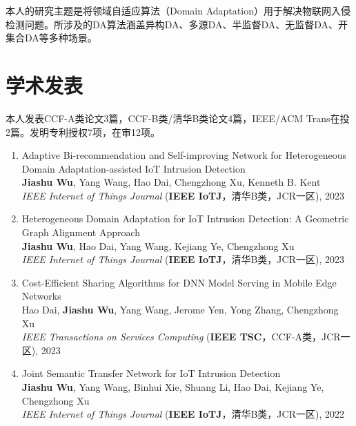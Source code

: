 \documentclass[letterpaper,11pt]{article}
\newcommand{\RNum}[1]{\uppercase\expandafter{\romannumeral #1\relax}}
\begin{document}
本人的研究主题是将领域自适应算法（Domain Adaptation）用于解决物联网入侵检测问题。所涉及的DA算法涵盖异构DA、多源DA、半监督DA、无监督DA、开集合DA等多种场景。

\vspace{1pt}

\section{学术发表}

本人发表CCF-A类论文3篇，CCF-B类/清华B类论文4篇，IEEE/ACM Trans在投2篇。发明专利授权7项，在审12项。

\begin{enumerate}
  \item Adaptive Bi-recommendation and Self-improving Network for Heterogeneous Domain Adaptation-assisted IoT Intrusion Detection\\
  \textbf{Jiashu Wu}, Yang Wang\textsuperscript{\Letter}, Hao Dai, Chengzhong Xu, Kenneth B. Kent\\
  \textit{IEEE Internet of Things Journal} (\textbf{IEEE IoTJ}，清华B类，JCR一区), 2023

  \item Heterogeneous Domain Adaptation for IoT Intrusion Detection: A Geometric Graph Alignment Approach\\
  \textbf{Jiashu Wu}, Hao Dai, Yang Wang\textsuperscript{\Letter}, Kejiang Ye, Chengzhong Xu\\
  \textit{IEEE Internet of Things Journal} (\textbf{IEEE IoTJ}，清华B类，JCR一区), 2023

  \item Cost-Efficient Sharing Algorithms for DNN Model Serving in Mobile Edge Networks\\
  Hao Dai, \textbf{Jiashu Wu}, Yang Wang\textsuperscript{\Letter}, Jerome Yen, Yong Zhang, Chengzhong Xu\\
  \textit{IEEE Transactions on Services Computing} (\textbf{IEEE TSC}，CCF-A类，JCR一区), 2023

  \item Joint Semantic Transfer Network for IoT Intrusion Detection\\
  \textbf{Jiashu Wu}, Yang Wang\textsuperscript{\Letter}, Binhui Xie, Shuang Li, Hao Dai, Kejiang Ye, Chengzhong Xu\\
  \textit{IEEE Internet of Things Journal} (\textbf{IEEE IoTJ}，清华B类，JCR一区), 2022


\end{enumerate}
\end{document}
